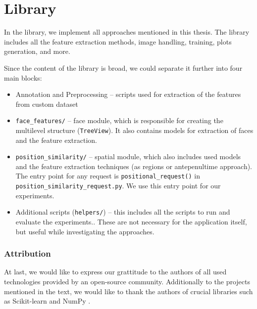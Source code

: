 \section{Library}

In the library, we implement all approaches mentioned in this thesis. The library includes all the feature extraction methods, image handling, training, plots generation, and more.

Since the content of the library is broad, we could separate it further into four main blocks: 
\begin{itemize}
    \item Annotation and Preprocessing -- scripts used for extraction of the features from custom dataset
    \item \verb+face_features/+ -- face module, which is responsible for creating the multilevel structure (\verb+TreeView+). It also contains models for extraction of faces and the feature extraction.
    \item \verb+position_similarity/+ -- spatial module, which also includes used models and the feature extraction techniques (as regions or antepenultime approach). The entry point for any request is \verb+positional_request()+ in \verb+position_similarity_request.py+. We use this entry point for our experiments.
    \item Additional scripts (\verb+helpers/+) -- this includes all the scripts to run and evaluate the experiments.. These are not necessary for the application itself, but useful while investigating the approaches.
\end{itemize}

\subsubsection*{Attribution}

At last, we would like to express our grattitude to the authors of all used technologies provided by an open-source community. Additionally to the projects mentioned in the text, we would like to thank the authors of crucial libraries such as Scikit-learn \citep{pedregosa2011scikit} and NumPy \citep{van2011numpy}.

